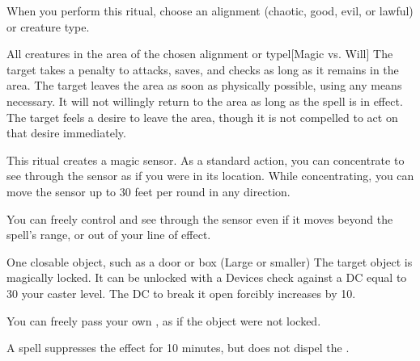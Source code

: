 \spellspecial When you perform this ritual, choose an alignment (chaotic, good, evil, or lawful) or creature type.
\begin{spelltargets}{All creatures in the area of the chosen alignment or type}l[Magic vs. Will]
    \spelleffect The target takes a  penalty to attacks, saves, and checks as long as it remains in the area.
    \spellsuccess The target leaves the area as soon as physically possible, using any means necessary. It will not willingly return to the area as long as the spell is in effect.
    \spellfailure The target feels a desire to leave the area, though it is not compelled to act on that desire immediately.
\end{spelltargets}

\spellrng{\rngmed}
\spelldur{\durlong \dismissable}
\spellline
\spelleffect This ritual creates a magic sensor. As a standard action, you can concentrate to see through the sensor as if you were in its location. While concentrating, you can move the sensor up to 30 feet per round in any direction.

You can freely control and see through the sensor even if it moves beyond the spell's range, or out of your line of effect.
\spellnotes {}

\begin{spelltarget}{One closable object, such as a door or box (Large or smaller)}
    \spelleffect The target object is magically locked. It can be unlocked with a Devices check against a DC equal to 30 \add your caster level. The DC to break it open forcibly increases by 10.

    You can freely pass your own , as if the object were not locked.
\end{spelltarget}
\spellnotes A  spell suppresses the effect for 10 minutes, but does not dispel the .

